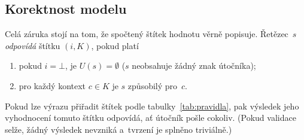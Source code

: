 \subsection{Korektnost modelu}
\label{sec:model-korektnost}

Celá záruka stojí na tom, že spočtený štítek hodnotu věrně popisuje. Řetězec~$s$ \emph{odpovídá} štítku $(i,K)$, pokud platí
\begin{enumerate}[label=(\alph*)]
    \item pokud $i = \bot$, je $U(s) = \emptyset$ ($s$ neobsahuje žádný znak útočníka);
    \item pro každý kontext $c \in K$ je $s$ způsobilý pro~$c$.
\end{enumerate}

\begin{tvrzeni}
\label{lem:stitky}
Pokud lze výrazu přiřadit štítek podle tabulky~\ref{tab:pravidla}, pak výsledek jeho vyhodnocení tomuto štítku odpovídá, ať útočník pošle cokoliv. (Pokud validace selže, žádný výsledek nevzniká a~tvrzení je splněno triviálně.)
\end{tvrzeni}

